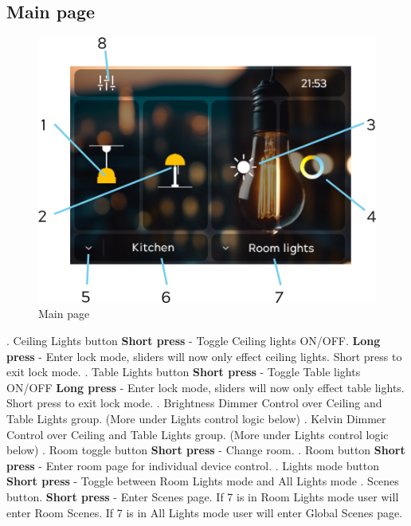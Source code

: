 \documentclass[10pt]{article}
\begin{document}
    \subsection{Main page}
    \begin{figure}[H]
    \centering
    \includegraphics{main_page_numbers.png}
    \caption{Main page}%
    \end{figure}
    . Ceiling Lights button \newline
    \textbf{Short press} - Toggle Ceiling lights ON/OFF. \newline
    \textbf{Long press} - Enter lock mode, sliders will now only effect ceiling lights. Short press to exit lock mode.
    . Table Lights button \newline
    \textbf{Short press} - Toggle Table lights ON/OFF \newline
    \textbf{Long press} - Enter lock mode, sliders will now only effect table lights. Short press to exit lock mode.
    . Brightness Dimmer \newline
    Control over Ceiling and Table Lights group. (More under Lights control logic below)
    . Kelvin Dimmer \newline
    Control over Ceiling and Table Lights group. (More under Lights control logic below)
    . Room toggle button \newline
    \textbf{Short press} - Change room.
    . Room button \newline
    \textbf{Short press} - Enter room page for individual device control.
    . Lights mode button \newline
    \textbf{Short press} - Toggle between Room Lights mode and All Lights mode
	  . Scenes button. \newline
    \textbf{Short press} - Enter Scenes page. If 7 is in Room Lights mode user will enter Room Scenes. If 7 is in All Lights mode user will enter Global Scenes page.
\end{document}
